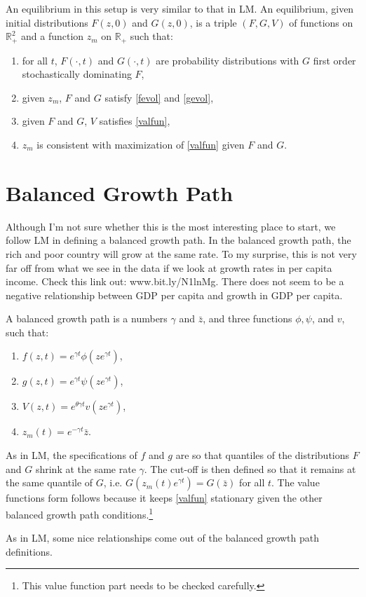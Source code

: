 \documentclass{article}
\begin{document}
An equilibrium in this setup is very similar to that in LM.  
An equilibrium, given initial distributions $F(z,0)$ and $G(z,0)$, is a triple $(F,G,V)$ of functions on $\mathbb{R}_+^2$ and a function $z_m$ on $\mathbb{R}_+$ such that: 
\begin{enumerate}
  \item for all $t$, $F(\cdot,t)$ and $G(\cdot,t)$ are probability distributions with $G$ first order stochastically dominating $F$, 
  \item given $z_m$, $F$ and $G$ satisfy \eqref{fevol} and \eqref{gevol},
  \item given $F$ and $G$, $V$ satisfies \eqref{valfun},
  \item $z_m$ is consistent with maximization of \eqref{valfun} given $F$ and $G$. 
\end{enumerate}

\section{Balanced Growth Path}
Although I'm not sure whether this is the most interesting place to start, we follow LM in defining a balanced growth path.
In the balanced growth path, the rich and poor country will grow at the same rate.
To my surprise, this is not very far off from what we see in the data if we look at growth rates in per capita income.
Check this link out: www.bit.ly/N1lnMg.
There does not seem to be a negative relationship between GDP per capita and growth in GDP per capita.

A balanced growth path is a numbers $\gamma$ and $\bar{z}$, and three functions $\phi,\psi$, and $v$, such that:
\begin{enumerate}
  \item $f(z,t) = e^{\gamma t} \phi(z e^{\gamma t})$,
  \item $g(z,t) = e^{\gamma t} \psi(z e^{\gamma t})$,
  \item $V(z,t) = e^{\theta \gamma t} v(ze^{\gamma t})$,
  \item $z_m(t) = e^{-\gamma t} \bar{z}$.
\end{enumerate}
As in LM, the specifications of $f$ and $g$ are so that quantiles of the distributions $F$ and $G$ shrink at the same rate $\gamma$.
The cut-off is then defined so that it remains at the same quantile of $G$, i.e. $G(z_m(t) e^{\gamma t}) = G(\bar{z})$ for all $t$.
The value functions form follows because it keeps \eqref{valfun} stationary given the other balanced growth path conditions.\footnote{This value function part needs to be checked carefully.}

As in LM, some nice relationships come out of the balanced growth path definitions.
\end{document}
